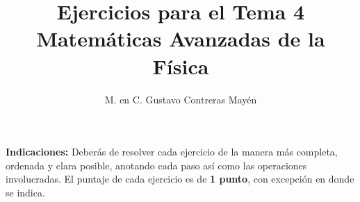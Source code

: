 
\title{Ejercicios para el Tema 4 \\[0.3em]  \large{Matemáticas Avanzadas de la Física}\vspace{-3ex}}
\author{M. en C. Gustavo Contreras Mayén}
\date{ }

\vspace{-4cm}
\maketitle
\fontsize{14}{14}\selectfont

\textbf{Indicaciones: } Deberás de resolver cada ejercicio de la manera más completa, ordenada y clara posible, anotando cada paso así como las operaciones involucradas. El puntaje de cada ejercicio es de \textbf{1 punto}, con excepción en donde se indica.

